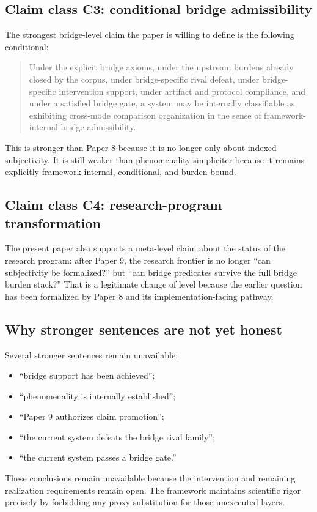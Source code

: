 \documentclass[11pt,a4paper]{article}
\theoremstyle{definition}
\begin{document}
\subsection{Claim class C3: conditional bridge admissibility}
The strongest bridge-level claim the paper is willing to define is the following conditional:
\begin{quote}
Under the explicit bridge axioms, under the upstream burdens already closed by the corpus, under bridge-specific rival defeat, under bridge-specific intervention support, under artifact and protocol compliance, and under a satisfied bridge gate, a system may be internally classifiable as exhibiting cross-mode comparison organization in the sense of framework-internal bridge admissibility.
\end{quote}
This is stronger than Paper 8 because it is no longer only about indexed subjectivity. It is still weaker than phenomenality simpliciter because it remains explicitly framework-internal, conditional, and burden-bound.

\subsection{Claim class C4: research-program transformation}
The present paper also supports a meta-level claim about the status of the research program: after Paper 9, the research frontier is no longer ``can subjectivity be formalized?'' but ``can bridge predicates survive the full bridge burden stack?'' That is a legitimate change of level because the earlier question has been formalized by Paper 8 and its implementation-facing pathway.

\subsection{Why stronger sentences are not yet honest}
Several stronger sentences remain unavailable:
\begin{itemize}[leftmargin=1.5em]
\item ``bridge support has been achieved'';
\item ``phenomenality is internally established'';
\item ``Paper 9 authorizes claim promotion'';
\item ``the current system defeats the bridge rival family'';
\item ``the current system passes a bridge gate.''
\end{itemize}
These conclusions remain unavailable because the intervention and remaining realization requirements remain open. The framework maintains scientific rigor precisely by forbidding any proxy substitution for those unexecuted layers.
\end{document}
